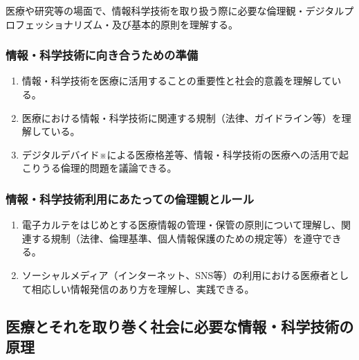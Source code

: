 \documentclass[
]{ltjsarticle}
\providecommand{\tightlist}{%
  \setlength{\itemsep}{0pt}\setlength{\parskip}{0pt}}
\begin{document}
医療や研究等の場面で、情報科学技術を取り扱う際に必要な倫理観・デジタルプロフェッショナリズム・及び基本的原則を理解する。

\hypertarget{ux60c5ux5831ux79d1ux5b66ux6280ux8853ux306bux5411ux304dux5408ux3046ux305fux3081ux306eux6e96ux5099}{%
\subsubsection{情報・科学技術に向き合うための準備}\label{ux60c5ux5831ux79d1ux5b66ux6280ux8853ux306bux5411ux304dux5408ux3046ux305fux3081ux306eux6e96ux5099}}

\begin{enumerate}
\def\labelenumi{\arabic{enumi}.}
\tightlist
\item
  情報・科学技術を医療に活用することの重要性と社会的意義を理解している。
\item
  医療における情報・科学技術に関連する規制（法律、ガイドライン等）を理解している。
\item
  デジタルデバイド※による医療格差等、情報・科学技術の医療への活用で起こりうる倫理的問題を議論できる。
\end{enumerate}

\hypertarget{ux60c5ux5831ux79d1ux5b66ux6280ux8853ux5229ux7528ux306bux3042ux305fux3063ux3066ux306eux502bux7406ux89b3ux3068ux30ebux30fcux30eb}{%
\subsubsection{情報・科学技術利用にあたっての倫理観とルール}\label{ux60c5ux5831ux79d1ux5b66ux6280ux8853ux5229ux7528ux306bux3042ux305fux3063ux3066ux306eux502bux7406ux89b3ux3068ux30ebux30fcux30eb}}

\begin{enumerate}
\def\labelenumi{\arabic{enumi}.}
\tightlist
\item
  電子カルテをはじめとする医療情報の管理・保管の原則について理解し、関連する規制（法律、倫理基準、個人情報保護のための規定等）を遵守できる。
\item
  ソーシャルメディア（インターネット、SNS等）の利用における医療者として相応しい情報発信のあり方を理解し、実践できる。
\end{enumerate}

\hypertarget{ux533bux7642ux3068ux305dux308cux3092ux53d6ux308aux5dfbux304fux793eux4f1aux306bux5fc5ux8981ux306aux60c5ux5831ux79d1ux5b66ux6280ux8853ux306eux539fux7406}{%
\subsection{医療とそれを取り巻く社会に必要な情報・科学技術の原理}\label{ux533bux7642ux3068ux305dux308cux3092ux53d6ux308aux5dfbux304fux793eux4f1aux306bux5fc5ux8981ux306aux60c5ux5831ux79d1ux5b66ux6280ux8853ux306eux539fux7406}}
\end{document}
